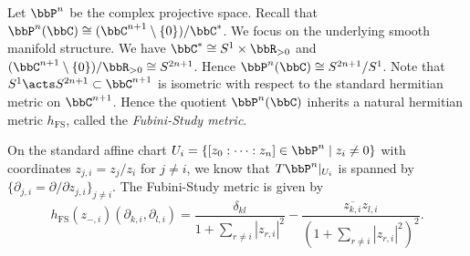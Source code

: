     \begin{example}\label{eg:Fubini-Study_metric_on_P^n}
        Let \(\bbP^n\) be the complex projective space.
        Recall that \(\bbP^n(\bbC) \cong (\bbC^{n+1} \setminus \{0\})/\bbC^*\).
        We focus on the underlying smooth manifold structure.
        We have \(\bbC^* \cong S^1 \times \bbR_{>0}\) and \((\bbC^{n+1} \setminus \{0\})/ \bbR_{>0} \cong S^{2n+1}\).
        Hence \(\bbP^n(\bbC) \cong S^{2n+1}/S^1\).
        Note that \(S^1 \acts S^{2n+1} \subset \bbC^{n+1}\) is isometric with respect to the standard hermitian metric on \(\bbC^{n+1}\).
        Hence the quotient \(\bbP^n(\bbC)\) inherits a natural hermitian metric \(h_{\text{FS}}\), called the \emph{Fubini-Study metric}.

        On the standard affine chart \(U_i = \{[z_0: \cdots : z_n] \in \bbP^n \mid z_i \neq 0\}\) with coordinates \(z_{j,i} = z_j/z_i\) for \(j \neq i\), 
        we know that \(T\bbP^n|_{U_i}\) is spanned by \(\{\partial_{j,i} = \partial/\partial z_{j,i}\}_{j \neq i}\).
        The Fubini-Study metric is given by
        \[h_{\text{FS}}(z_{-,i})(\partial_{k,i}, \partial_{l,i}) = \frac{\delta_{kl}}{1 + \sum_{r \neq i} |z_{r,i}|^2} - \frac{\overline{z_{k,i}} z_{l,i}}{(1 + \sum_{r \neq i} |z_{r,i}|^2)^2}.\]

\end{example}
